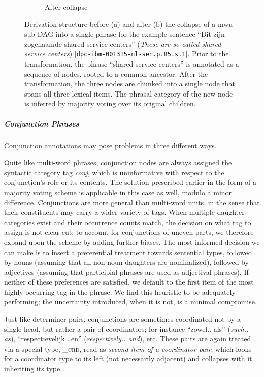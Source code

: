 \begin{figure}[t]
\begin{subfigure}[t]{0.43\textwidth}
        \caption{After collapse}
    \end{subfigure}
    \caption[Multi-Word Unit Collapse]{Derivation structure before (a) and after (b) the collapse of a mwu sub-DAG into a single phrase for the example sentence ``Dit zijn zogenaamde shared service centers'' (\textit{These are so-called shared service centers}) [\texttt{dpc-ibm-001315-nl-sen.p.85.s.1}]. Prior to the transformation, the phrase ``shared service centers'' is annotated as a sequence of nodes, rooted to a common ancestor. After the transformation, the three nodes are chunked into a single node that spans all three lexical items. The phrasal category of the new node is inferred by majority voting over its original children.}
    \label{fig:mwu}
\end{figure}

\subparagraph{Conjunction Phrases}
Conjunction annotations may pose problems in three different ways.

Quite like multi-word phrases, conjunction nodes are always assigned the syntactic category tag \textit{conj}, which is uninformative with respect to the conjunction's role or its contents.
The solution prescribed earlier in the form of a majority voting scheme is applicable in this case as well, modulo a minor difference.
Conjunctions are more general than multi-word units, in the sense that their constituents may carry a wider variety of tags.
When multiple daughter categories exist and their occurrence counts match, the decision on what tag to assign is not clear-cut; to account for conjunctions of uneven parts, we therefore expand upon the scheme by adding further biases.
The most informed decision we can make is to insert a preferential treatment towards sentential types, followed by nouns (assuming that all non-noun daughters are nominalized), followed by adjectives (assuming that participial phrases are used as adjectival phrases).
If neither of these preferences are satisfied, we default to the first item of the most highly occurring tag in the phrase.
We find this heuristic to be adequately performing; the uncertainty introduced, when it is not, is a minimal compromise.

Just like determiner pairs, conjunctions are sometimes coordinated not by a single head, but rather a pair of coordinators; for instance ``zowel.. als'' (\textit{such.. as}), ``respectievelijk ..en'' (\textit{respectively.. and}), etc. 
These pairs are again treated via a special type, \textsc{\_crd}, read as \textit{second item of a coordinator pair}, which looks for a coordinator type to its left (not necessarily adjacent) and collapses with it inheriting its type.

